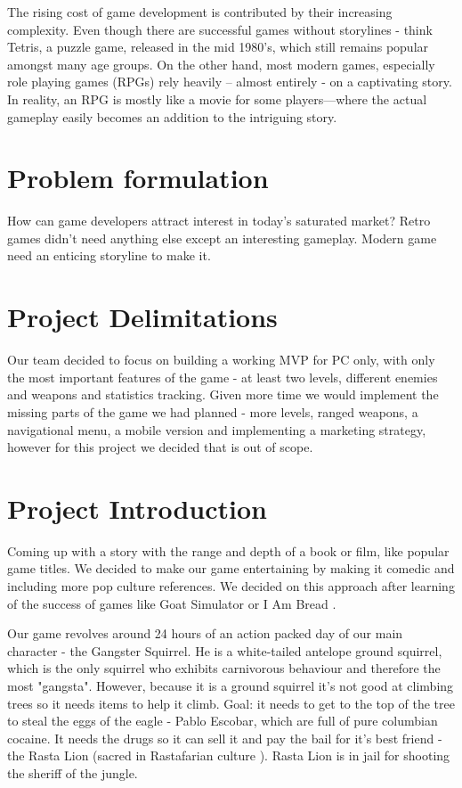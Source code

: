 \documentclass[12p]{article}
\begin{document}
The rising cost of game development is contributed by their increasing complexity. Even though there are successful games without storylines - think Tetris, a puzzle game, released in the mid 1980’s, which still remains popular amongst many age groups. On the other hand, most modern games, especially role playing games (RPGs) rely heavily – almost entirely - on a captivating story. In reality, an RPG is mostly like a movie for some players—where the actual gameplay easily becomes an addition to the intriguing story.\cite{GameDevelopmentEssentials}

\section{Problem formulation} \label{ProblemFormulation}

How can game developers attract interest in today’s saturated market? Retro games didn’t need anything else except an interesting gameplay. Modern game need an enticing storyline to make it.

\section{Project Delimitations} \label{ProjectDelimitations}

Our team decided to focus on building a working MVP for PC only, with only the most important features of the game - at least two levels, different enemies and weapons and statistics tracking. Given more time we would implement the missing parts of the game we had planned - more levels, ranged weapons, a navigational menu, a mobile version and implementing a marketing strategy, however for this project we decided that is out of scope.

\section{Project Introduction} \label{ProjectIntroduction}

Coming up with a story with the range and depth of a book or film, like popular game titles. We decided to make our game entertaining by making it comedic and including more pop culture references. We decided on this approach after learning of the success of games like Goat Simulator \cite{GoatSimulator} or I Am Bread \cite{IAmBread}.

Our game revolves around 24 hours of an action packed day of our main character - the Gangster Squirrel. He is a white-tailed antelope ground squirrel, which is the only squirrel who exhibits carnivorous behaviour \cite{CarnivorousSquirells} and therefore the most "gangsta". However, because it is a ground squirrel it’s not good at climbing trees so it needs items to help it climb.
Goal: it needs to get to the top of the tree to steal the eggs of the eagle - Pablo Escobar, which are full of pure columbian cocaine. It needs the drugs so it can sell it and pay the bail for it’s best friend - the Rasta Lion (sacred in Rastafarian culture \cite{RastaLion}). Rasta Lion is in jail for shooting the sheriff \cite{Sheriff} of the jungle.
\end{document}
